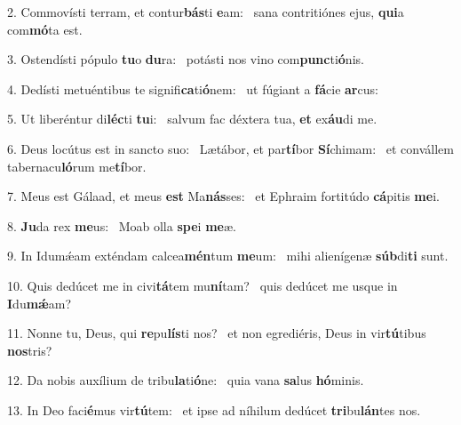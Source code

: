 2. Commovísti terram, et contur\textbf{bás}ti \textbf{e}am: \ast\  sana contritiónes ejus, \textbf{qui}a com\textbf{mó}ta est.\

3. Ostendísti pópulo \textbf{tu}o \textbf{du}ra: \ast\  potásti nos vino com\textbf{punc}ti\textbf{ó}nis.\

4. Dedísti metuéntibus te signifi\textbf{ca}ti\textbf{ó}nem: \ast\  ut fúgiant a \textbf{fá}cie \textbf{ar}cus:\

5. Ut liberéntur di\textbf{léc}ti \textbf{tu}i: \ast\  salvum fac déxtera tua, \textbf{et} ex\textbf{áu}di me.\

6. Deus locútus est in sancto suo: \dag\  Lætábor, et par\textbf{tí}bor \textbf{Sí}chimam: \ast\  et convállem tabernacu\textbf{ló}rum me\textbf{tí}bor.\

7. Meus est Gálaad, et meus \textbf{est} Ma\textbf{nás}ses: \ast\  et Ephraim fortitúdo \textbf{cá}pitis \textbf{me}i.\

8. \textbf{Ju}da rex \textbf{me}us: \ast\  Moab olla \textbf{spe}i \textbf{me}æ.\

9. In Idumǽam exténdam calcea\textbf{mén}tum \textbf{me}um: \ast\  mihi alienígenæ \textbf{súb}di\textbf{ti} sunt.\

10. Quis dedúcet me in civi\textbf{tá}tem mu\textbf{ní}tam? \ast\  quis dedúcet me usque in \textbf{I}du\textbf{mǽ}am?\

11. Nonne tu, Deus, qui \textbf{re}pu\textbf{lís}ti nos? \ast\  et non egrediéris, Deus in vir\textbf{tú}tibus \textbf{nos}tris?\

12. Da nobis auxílium de tribu\textbf{la}ti\textbf{ó}ne: \ast\  quia vana \textbf{sa}lus \textbf{hó}minis.\

13. In Deo faci\textbf{é}mus vir\textbf{tú}tem: \ast\  et ipse ad níhilum dedúcet \textbf{tri}bu\textbf{lán}tes nos.\

